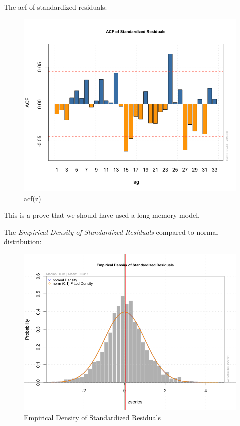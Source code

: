 \documentclass[a4paper, 11pt]{article}
\begin{document}
The acf of standardized residuals:
\begin{figure}[H]
\centering
\caption{acf(z)}
\includegraphics[scale=.60]{zacf.png}
\end{figure}
This is a prove that we should have used a long memory model.\par 


The \textit{Empirical Density of Standardized Residuals} compared to normal distribution:
\begin{figure}[H]
\centering
\caption{Empirical Density of Standardized Residuals}
\includegraphics[scale=.60]{density.png}
\end{figure}
 
\end{document}

